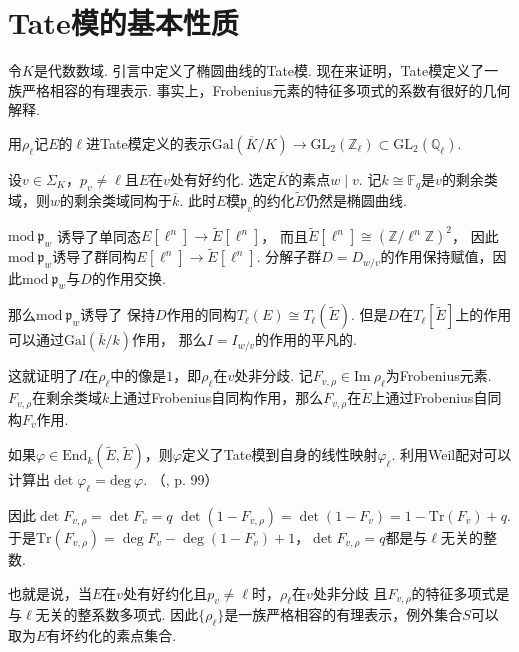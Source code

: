 \section{Tate模的基本性质}

令$K$是代数数域.
引言中定义了椭圆曲线的Tate模.
现在来证明，Tate模定义了一族严格相容的有理表示. 事实上，Frobenius元素的特征多项式的系数有很好的几何解释.

用$\rho_{\ell}$记$E$的$\ell$进Tate模定义的表示$\mathrm{Gal}(\overline{K}/K)\to \mathrm{GL}_2(\mathbb{Z}_{\ell})\subset \mathrm{GL}_2(\mathbb{Q}_{\ell})$.

设$v\in \Sigma_K$，$p_v\neq \ell$且$E$在$v$处有好约化. 选定$\overline{K}$的素点$w\mid v$.
记$k\cong \mathbb{F}_q$是$v$的剩余类域，则$w$的剩余类域同构于$\overline{k}$.
此时$E$模$\mathfrak{p}_v$的约化$\tilde{E}$仍然是椭圆曲线.

$\mathrm{mod}\ \mathfrak{p}_{w}$
诱导了单同态$E[\ell^n]\to \tilde{E}[\ell^n]$，
而且$\tilde{E}[\ell^n]\cong (\mathbb{Z}/\ell^n \mathbb{Z})^2$，
因此$\mathrm{mod}\ \mathfrak{p}_{w}$诱导了群同构$E[\ell^n]\to \tilde{E}[\ell^n]$.
分解子群$D=D_{w/v}$的作用保持赋值，因此$\mathrm{mod}\ \mathfrak{p}_{w}$与$D$的作用交换.

那么$\mathrm{mod}\ \mathfrak{p}_{w}$诱导了
保持$D$作用的同构$T_{\ell}(E)\cong T_{\ell}(\tilde{E})$.
但是$D$在$T_{\ell}[\tilde{E}]$上的作用可以通过$\mathrm{Gal}(\overline{k}/k)$作用，
那么$I=I_{w/v}$的作用的平凡的.

这就证明了$I$在$\rho_{\ell}$中的像是$1$，即$\rho_{\ell}$在$v$处非分歧.
记$F_{v,\rho}\in \mathrm{Im}\ \rho_{\ell}$为Frobenius元素.
$F_{v,\rho}$在剩余类域$k$上通过Frobenius自同构作用，那么$F_{v,\rho}$在$\tilde{E}$上通过Frobenius自同构$F_v$作用.

如果$\varphi\in\mathrm{End}_{k}(\tilde{E}, \tilde{E})$，则$\varphi$定义了Tate模到自身的线性映射$\varphi_{\ell}$.
利用Weil配对可以计算出$\det \varphi_{\ell} = \mathrm{deg}\ \varphi$.
（\parencite{silverman2009arithmetic}, p. 99）

因此$\det F_{v,\rho} = \det F_v = q$
$\det (1-F_{v,\rho}) = \det (1-F_v) = 1 - \mathrm{Tr}(F_v) + q$.
于是$\mathrm{Tr}(F_{v,\rho}) = \deg F_v - \deg (1-F_v) + 1$，$\det F_{v,\rho} = q$都是与$\ell$无关的整数.

也就是说，当$E$在$v$处有好约化且$p_v\neq \ell$时，$\rho_{\ell}$在$v$处非分歧
且$F_{v,\rho}$的特征多项式是与$\ell$无关的整系数多项式.
因此$\{\rho_{\ell}\}$是一族严格相容的有理表示，例外集合$S$可以取为$E$有坏约化的素点集合.


